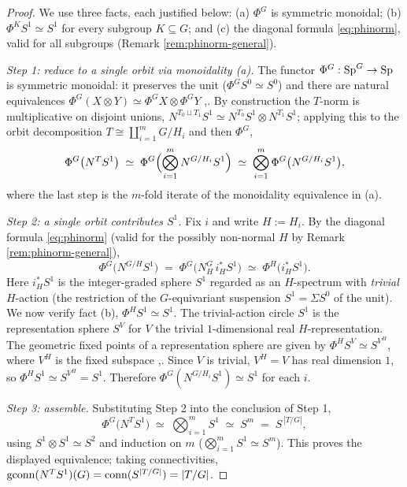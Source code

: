 \begin{proof}
We use three facts, each justified below: (a) $\Phi^G$ is symmetric monoidal;
(b) $\Phi^K S^1\simeq S^1$ for every subgroup $K\subseteq G$; and (c) the diagonal
formula \eqref{eq:phinorm}, valid for all subgroups (Remark
\ref{rem:phinorm-general}).

\emph{Step 1: reduce to a single orbit via monoidality (a).}
The functor $\Phi^G:\mathrm{Sp}^G\to\mathrm{Sp}$ is symmetric monoidal: it preserves the
unit ($\Phi^G S^0\simeq S^0$) and there are natural equivalences
$\Phi^G(X\otimes Y)\simeq\Phi^G X\otimes\Phi^G Y$
\cite[Prop.~B.96, \S2.5.2]{HHR16},\cite[\S6]{HillPrimer}. By construction the
$T$-norm is multiplicative on disjoint unions,
$N^{T_0\sqcup T_1}S^1\simeq N^{T_0}S^1\otimes N^{T_1}S^1$; applying this to the orbit
decomposition $T\cong\coprod_{i=1}^{m}G/H_i$ and then $\Phi^G$,
\[
\Phi^G\bigl(N^T S^1\bigr)
\;\simeq\;\Phi^G\Bigl(\bigotimes_{i=1}^m N^{G/H_i}S^1\Bigr)
\;\simeq\;\bigotimes_{i=1}^m\Phi^G\bigl(N^{G/H_i}S^1\bigr),
\]
where the last step is the $m$-fold iterate of the monoidality equivalence in (a).

\emph{Step 2: a single orbit contributes $S^1$.}
Fix $i$ and write $H:=H_i$. By the diagonal formula \eqref{eq:phinorm} (valid for
the possibly non-normal $H$ by Remark \ref{rem:phinorm-general}),
\[
\Phi^G\bigl(N^{G/H}S^1\bigr)\;=\;\Phi^G\bigl(N^G_H\,i_H^\ast S^1\bigr)
\;\simeq\;\Phi^H\bigl(i_H^\ast S^1\bigr).
\]
Here $i_H^\ast S^1$ is the integer-graded sphere $S^1$ regarded as an
$H$-spectrum with \emph{trivial} $H$-action (the restriction of the
$G$-equivariant suspension $S^1=\Sigma S^0$ of the unit). We now verify fact (b),
$\Phi^H S^1\simeq S^1$. The trivial-action circle $S^1$ is the representation
sphere $S^V$ for $V$ the trivial $1$-dimensional real $H$-representation. The
geometric fixed points of a representation sphere are given by
$\Phi^H S^V\simeq S^{V^H}$, where $V^H$ is the fixed subspace
\cite[\S6]{HillPrimer},\cite[Prop.~B.96]{HHR16}. Since $V$ is trivial,
$V^H=V$ has real dimension $1$, so $\Phi^H S^1\simeq S^{V^H}=S^1$. Therefore
$\Phi^G(N^{G/H_i}S^1)\simeq S^1$ for each $i$.

\emph{Step 3: assemble.}
Substituting Step 2 into the conclusion of Step 1,
\[
\Phi^G\bigl(N^T S^1\bigr)\;\simeq\;\bigotimes_{i=1}^m S^1
\;\simeq\;S^{m}\;=\;S^{\,|T/G|},
\]
using $S^1\otimes S^1\simeq S^2$ and induction on $m$ ($\bigotimes_{i=1}^m
S^1\simeq S^m$). This proves the displayed equivalence; taking connectivities,
$\operatorname{gconn}(N^TS^1)(G)=\operatorname{conn}(S^{|T/G|})=|T/G|$.
\end{proof}


